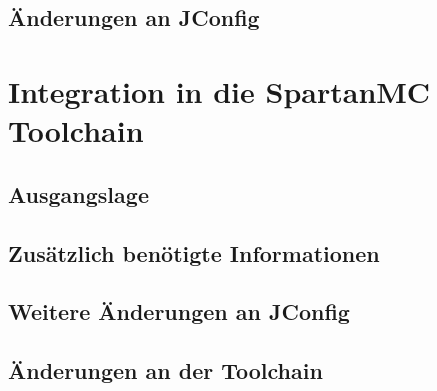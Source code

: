 \subsection{Änderungen an JConfig}

\section{Integration in die SpartanMC Toolchain}
\subsection{Ausgangslage}

\subsection{Zusätzlich benötigte Informationen}

\subsection{Weitere Änderungen an JConfig}

\subsection{Änderungen an der Toolchain}

